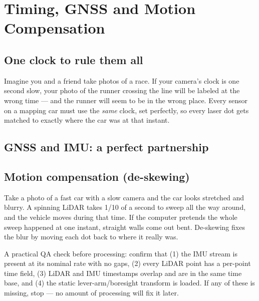 \chapter{Timing, GNSS and Motion Compensation}

\section{One clock to rule them all}

\begin{kid}
Imagine you and a friend take photos of a race. If your camera's clock is one second slow, your photo of the runner crossing the line will be labeled at the wrong time --- and the runner will seem to be in the wrong place. Every sensor on a mapping car must use the \emph{same} clock, set perfectly, so every laser dot gets matched to exactly where the car was at that instant.
\end{kid}


\section{GNSS and IMU: a perfect partnership}


\section{Motion compensation (de-skewing)}

\begin{kid}
Take a photo of a fast car with a slow camera and the car looks stretched and blurry. A spinning LiDAR takes 1/10 of a second to sweep all the way around, and the vehicle moves during that time. If the computer pretends the whole sweep happened at one instant, straight walls come out bent. De-skewing fixes the blur by moving each dot back to where it really was.
\end{kid}


\begin{tip}
A practical QA check before processing: confirm that (1) the IMU stream is present at its nominal rate with no gaps, (2) every LiDAR point has a per-point time field, (3) LiDAR and IMU timestamps overlap and are in the same time base, and (4) the static lever-arm/boresight transform is loaded. If any of these is missing, stop --- no amount of processing will fix it later.
\end{tip}
